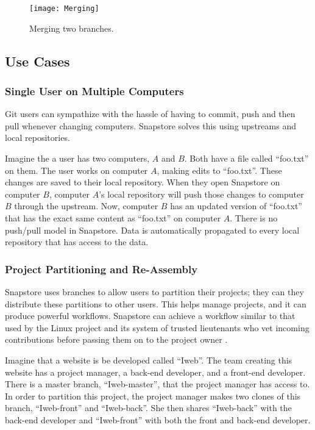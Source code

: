 \begin{figure}
\texttt{[image: Merging]}
\caption{Merging two branches.}
\label{arm:fig1}
\end{figure}

\subsection{Use Cases}

\subsubsection{Single User on Multiple Computers}

Git users can sympathize with the hassle of having to commit, push and then pull whenever changing computers. Snapstore solves this using upstreams and local repositories.

Imagine the a user has two computers, $A$ and $B$. Both have a file called ``foo.txt'' on them. The user works on computer $A$, making edits to ``foo.txt''. These changes are saved to their local repository. When they open Snapstore on computer $B$, computer $A$'s local repository will push those changes to computer $B$ through the upstream. Now, computer $B$ has an updated version of ``foo.txt'' that has the exact same content as ``foo.txt'' on computer $A$. There is no push/pull model in Snapstore. Data is automatically propagated to every local repository that has access to the data.

\subsubsection{Project Partitioning and Re-Assembly}

Snapstore uses branches to allow users to partition their projects; they can they distribute these partitions to other users. This helps manage projects, and it can produce powerful workflows. Snapstore can achieve a workflow similar to that used by the Linux project and its system of trusted lieutenants who vet incoming contributions before passing them on to the project owner \cite{linux}.

Imagine that a website is be developed called ``Iweb''. The team creating this website has a project manager, a back-end developer, and a front-end developer. There is a master branch, ``Iweb-master'', that the project manager has access to. In order to partition this project, the project manager makes two clones of this branch, ``Iweb-front'' and ``Iweb-back''. She then shares ``Iweb-back'' with the back-end developer and ``Iweb-front'' with both the front and back-end developer.


